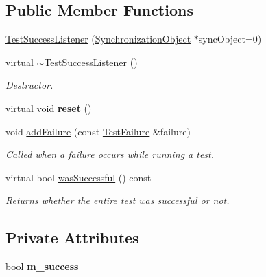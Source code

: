 \subsection*{Public Member Functions}
\begin{DoxyCompactItemize}
\item 
\hyperlink{class_test_success_listener_a88e82abf23a0563e345e0883d132f267}{Test\+Success\+Listener} (\hyperlink{class_synchronized_object_1_1_synchronization_object}{Synchronization\+Object} $\ast$sync\+Object=0)
\item 
virtual \hyperlink{class_test_success_listener_a0d51db5b1bfc10a479563244d6dcd98c}{$\sim$\+Test\+Success\+Listener} ()\hypertarget{class_test_success_listener_a0d51db5b1bfc10a479563244d6dcd98c}{}\label{class_test_success_listener_a0d51db5b1bfc10a479563244d6dcd98c}

\begin{DoxyCompactList}\small\item\em Destructor. \end{DoxyCompactList}\item 
virtual void {\bfseries reset} ()\hypertarget{class_test_success_listener_aa6172d9c318a9a0fdb789b7668550290}{}\label{class_test_success_listener_aa6172d9c318a9a0fdb789b7668550290}

\item 
void \hyperlink{class_test_success_listener_a912bb5ea408b2be5b39cfb45e1bb402f}{add\+Failure} (const \hyperlink{class_test_failure}{Test\+Failure} \&failure)
\begin{DoxyCompactList}\small\item\em Called when a failure occurs while running a test. \end{DoxyCompactList}\item 
virtual bool \hyperlink{class_test_success_listener_aa33c3787a9251216c2ed4a865b4d4249}{was\+Successful} () const \hypertarget{class_test_success_listener_aa33c3787a9251216c2ed4a865b4d4249}{}\label{class_test_success_listener_aa33c3787a9251216c2ed4a865b4d4249}

\begin{DoxyCompactList}\small\item\em Returns whether the entire test was successful or not. \end{DoxyCompactList}\end{DoxyCompactItemize}
\subsection*{Private Attributes}
\begin{DoxyCompactItemize}
\item 
bool {\bfseries m\+\_\+success}\hypertarget{class_test_success_listener_a122a8627841f22a808920c2e960bd716}{}\label{class_test_success_listener_a122a8627841f22a808920c2e960bd716}

\end{DoxyCompactItemize}

